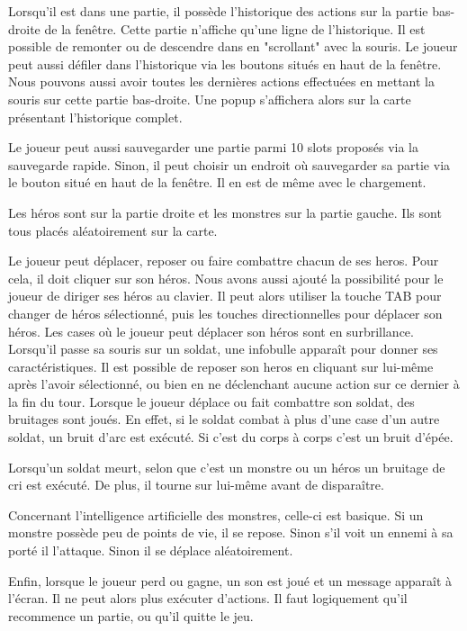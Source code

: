 \documentclass{article}
\begin{document}
Lorsqu'il est dans une partie, il possède l'historique des actions sur la partie bas-droite de la fenêtre. 
Cette partie n'affiche qu'une ligne de l'historique. Il est possible de remonter ou de descendre dans en "scrollant" avec la souris.
Le joueur peut aussi défiler dans l'historique via les boutons situés en haut de la fenêtre.
Nous pouvons aussi avoir toutes les dernières actions effectuées en mettant la souris sur cette partie bas-droite.
Une popup s'affichera alors sur la carte présentant l'historique complet.

Le joueur peut aussi sauvegarder une partie parmi 10 slots proposés via la sauvegarde rapide.
Sinon, il peut choisir un endroit où sauvegarder sa partie via le bouton situé en haut de la fenêtre.
Il en est de même avec le chargement.

Les héros sont sur la partie droite et les monstres sur la partie gauche. Ils sont tous placés aléatoirement sur la carte.

Le joueur peut déplacer, reposer ou faire combattre chacun de ses heros.
Pour cela, il doit cliquer sur son héros. Nous avons aussi ajouté la possibilité pour le joueur de diriger ses héros au clavier.
Il peut alors utiliser la touche TAB pour changer de héros sélectionné, puis les touches directionnelles pour déplacer son héros.
Les cases où le joueur peut déplacer son héros sont en surbrillance.
Lorsqu'il passe sa souris sur un soldat, une infobulle apparaît pour donner ses caractéristiques.
Il est possible de reposer son heros en cliquant sur lui-même après l'avoir sélectionné, ou bien en ne déclenchant aucune action sur ce dernier à la fin du tour.
Lorsque le joueur déplace ou fait combattre son soldat, des bruitages sont joués.
En effet, si le soldat combat à plus d'une case d'un autre soldat, un bruit d'arc est exécuté.
Si c'est du corps à corps c'est un bruit d'épée.

Lorsqu'un soldat meurt, selon que c'est un monstre ou un héros un bruitage de cri est exécuté.
De plus, il tourne sur lui-même avant de disparaître.

Concernant l'intelligence artificielle des monstres, celle-ci est basique.
Si un monstre possède peu de points de vie, il se repose.
Sinon s'il voit un ennemi à sa porté il l'attaque.
Sinon il se déplace aléatoirement.

Enfin, lorsque le joueur perd ou gagne, un son est joué et un message apparaît à l'écran. Il ne peut alors plus exécuter d'actions.
Il faut logiquement qu'il recommence un partie, ou qu'il quitte le jeu.
\end{document}
